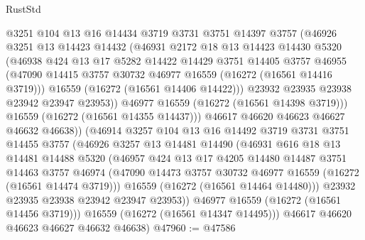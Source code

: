 \begin{lexlean}{RustStd}
\begin{coremodule}
                @3251
                @104
                @13
                @16
                @14434
                @3719
                @3731
                @3751
                @14397
                @3757
                (@46926
                  @3251
                  @13
                  @14423
                  @14432
                  (@46931
                    @2172
                    @18
                    @13
                    @14423
                    @14430
                    @5320
                    (@46938
                      @424
                      @13
                      @17
                      @5282
                      @14422
                      @14429
                      @3751
                      @14405
                      @3757
                      @46955
                      (@47090 @14415 @3757 @30732 @46977 @16559 (@16272 (@16561 @14416 @3719)))
                      @16559
                      (@16272 (@16561 @14406 @14422)))
                    @23932
                    @23935
                    @23938
                    @23942
                    @23947
                    @23953))
                @46977
                @16559
                (@16272 (@16561 @14398 @3719)))
              @16559
              (@16272 (@16561 @14355 @14437)))
            @46617
            @46620
            @46623
            @46627
            @46632
            @46638))
        (@46914
          @3257
          @104
          @13
          @16
          @14492
          @3719
          @3731
          @3751
          @14455
          @3757
          (@46926
            @3257
            @13
            @14481
            @14490
            (@46931
              @616
              @18
              @13
              @14481
              @14488
              @5320
              (@46957
                @424
                @13
                @17
                @4205
                @14480
                @14487
                @3751
                @14463
                @3757
                @46974
                (@47090 @14473 @3757 @30732 @46977 @16559 (@16272 (@16561 @14474 @3719)))
                @16559
                (@16272 (@16561 @14464 @14480)))
              @23932
              @23935
              @23938
              @23942
              @23947
              @23953))
          @46977
          @16559
          (@16272 (@16561 @14456 @3719)))
        @16559
        (@16272 (@16561 @14347 @14495)))
      @46617
      @46620
      @46623
      @46627
      @46632
      @46638)
@47960 := @47586

\end{coremodule}
\end{lexlean}
